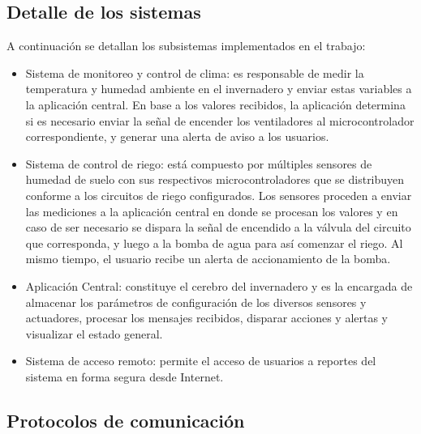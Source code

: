 \subsection{Detalle de los sistemas}
\label{Detalle de los sistemas}

A continuación se detallan los subsistemas implementados en el trabajo:

\begin{itemize}
\item Sistema de monitoreo y control de clima: es responsable de medir la temperatura y humedad ambiente en el invernadero y enviar estas variables a la aplicación central. En base a los valores recibidos, la aplicación determina si es necesario enviar la señal de encender los ventiladores al microcontrolador correspondiente, y generar una alerta de aviso a los usuarios.


%

\item Sistema de control de riego: está compuesto por múltiples sensores de humedad de suelo con sus respectivos microcontroladores que se distribuyen conforme a los circuitos de riego configurados. Los sensores proceden a enviar las mediciones a la aplicación central en donde se procesan los valores y en caso de ser necesario se dispara la señal de encendido a la válvula del circuito que corresponda, y luego a la bomba de agua para así comenzar el riego. Al mismo tiempo, el usuario recibe un alerta de accionamiento de la bomba.

\item Aplicación Central: constituye el cerebro del invernadero y es la encargada de almacenar los parámetros de configuración de los diversos sensores y actuadores, procesar los mensajes recibidos, disparar acciones y alertas y visualizar el estado general.

\item Sistema de acceso remoto: permite el acceso de usuarios a reportes del sistema en forma segura desde Internet.   
\end{itemize}

\subsection{Protocolos de comunicación}
\label{Protocolos de comunicación}

